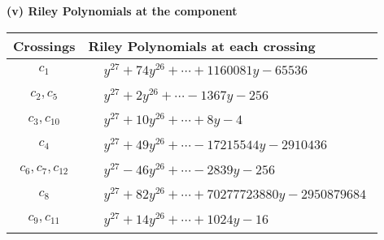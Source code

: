 \documentclass[1p]{elsarticle_modified}
\theoremstyle{definition}
\begin{document}
\newpage\renewcommand{\arraystretch}{1}
\flushleft \textbf{(v) Riley Polynomials at the component}\newline \\
\begin{tabular}{m{50pt}|m{274pt}}
Crossings & \hspace{64pt}Riley Polynomials at each crossing \\
\hline $$\begin{aligned}c_{1}\end{aligned}$$&$\begin{aligned}
&y^{27}+74 y^{26}+\cdots+1160081 y-65536
\end{aligned}$\\
\hline $$\begin{aligned}c_{2},c_{5}\end{aligned}$$&$\begin{aligned}
&y^{27}+2 y^{26}+\cdots-1367 y-256
\end{aligned}$\\
\hline $$\begin{aligned}c_{3},c_{10}\end{aligned}$$&$\begin{aligned}
&y^{27}+10 y^{26}+\cdots+8 y-4
\end{aligned}$\\
\hline $$\begin{aligned}c_{4}\end{aligned}$$&$\begin{aligned}
&y^{27}+49 y^{26}+\cdots-17215544 y-2910436
\end{aligned}$\\
\hline $$\begin{aligned}c_{6},c_{7},c_{12}\end{aligned}$$&$\begin{aligned}
&y^{27}-46 y^{26}+\cdots-2839 y-256
\end{aligned}$\\
\hline $$\begin{aligned}c_{8}\end{aligned}$$&$\begin{aligned}
&y^{27}+82 y^{26}+\cdots+70277723880 y-2950879684
\end{aligned}$\\
\hline $$\begin{aligned}c_{9},c_{11}\end{aligned}$$&$\begin{aligned}
&y^{27}+14 y^{26}+\cdots+1024 y-16
\end{aligned}$\\
\hline
\end{tabular}\\~\\
\end{document}
